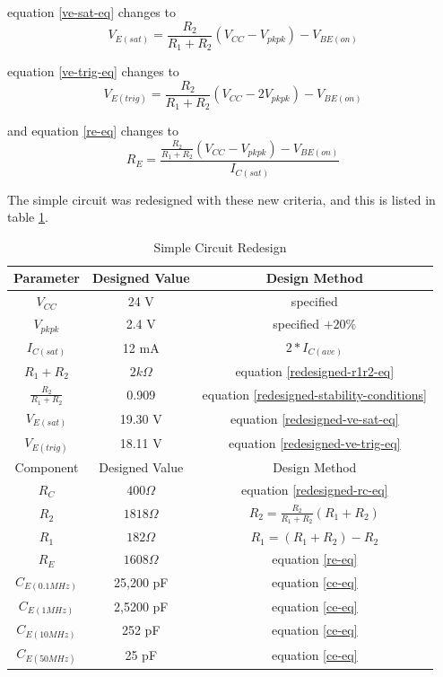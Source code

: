 \documentclass[titlepage, letterpaper, 10.5pt]{article}
\begin{document}
equation \ref{ve-sat-eq} changes to
\begin{equation}
V_{E(sat)}=\frac{R_{2}}{R_{1}+R_{2}}(V_{CC}-V_{pkpk})-V_{BE(on)}
\label{redesigned-ve-sat-eq}
\end{equation}

equation \ref{ve-trig-eq} changes to
\begin{equation}
V_{E(trig)}=\frac{R_{2}}{R_{1}+R_{2}}(V_{CC}-2V_{pkpk})-V_{BE(on)}
\label{redesigned-ve-trig-eq}
\end{equation}

and equation \ref{re-eq} changes to
\begin{equation}
R_{E}=\frac{\frac{R_{2}}{R_{1}+R_{2}}(V_{CC}-V_{pkpk})-V_{BE(on)}}{I_{C(sat)}}
\label{redesigned-re-eq}
\end{equation}

The simple circuit was redesigned with these new criteria, and this is listed
in table \ref{simple-circuit-redesign-table}.

\begin{table}[ht]
\centering
\caption{Simple Circuit Redesign}
\begin{tabular}{c | c | c}
\hline\hline
Parameter	&Designed Value	&Design Method	\\
\hline\hline
$V_{CC}$	&24 V	&specified	\\
$V_{pkpk}$	&2.4 V	&specified $+20\%$	\\
$I_{C(sat)}$	&12 mA	&$2*I_{C(ave)}$	\\
$R_{1}+R_{2}$	&$2k\Omega$	&equation \ref{redesigned-r1r2-eq}	\\
$\frac{R_{2}}{R_{1}+R_{2}}$	&0.909	&equation \ref{redesigned-stability-conditions}	\\
$V_{E(sat)}$	&19.30 V	&equation \ref{redesigned-ve-sat-eq}	\\
$V_{E(trig)}$	&18.11 V	&equation \ref{redesigned-ve-trig-eq}	\\
\hline
Component	&Designed Value	&Design Method	\\
\hline
$R_{C}$	&$400\Omega$	&equation \ref{redesigned-rc-eq}	\\
$R_{2}$	&$1818\Omega$	&$R_{2}=\frac{R_{2}}{R_{1}+R_{2}}(R_{1}+R_{2})$	\\
$R_{1}$	&$182\Omega$	&$R_{1}=(R_{1}+R_{2})-R_{2}$	\\
$R_{E}$	&$1608\Omega$	&equation \ref{re-eq}	\\
$C_{E(0.1MHz)}$	&25,200 pF	&equation \ref{ce-eq}	\\
$C_{E(1MHz)}$	&2,5200 pF	&equation \ref{ce-eq}	\\
$C_{E(10MHz)}$	&252 pF	&equation \ref{ce-eq}	\\
$C_{E(50MHz)}$	&25 pF	&equation \ref{ce-eq}	\\
\hline\hline
\end{tabular}
\label{simple-circuit-redesign-table}
\end{table}
\end{document}
